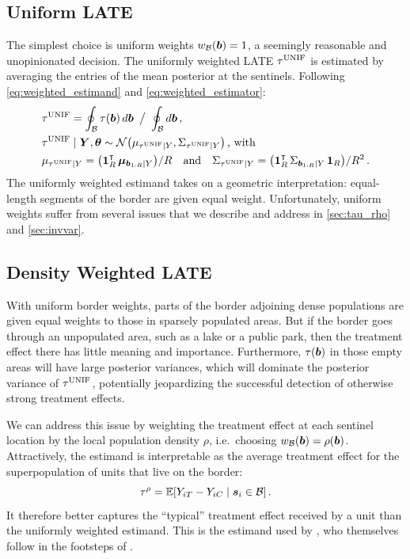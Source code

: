 \subsection{Uniform LATE}
The simplest choice is uniform weights \(w_{\mathcal{B}}(\bm{b})=1\), a seemingly reasonable and unopinionated decision.
The uniformly weighted LATE \(\tau^{\mathrm{UNIF}}\) is estimated by averaging the entries of the mean posterior at the sentinels.
Following \autoref{eq:weighted_estimand} and \autoref{eq:weighted_estimator}:
\begin{equation}\begin{split}
    &\unifavg = \oint_\border \tau(\sentinel) \dif\sentinel
        \ \big/ \ 
        \oint_\border \dif{\sentinel}  \,, \\
    &\unifavg \mid \Yvec, \hyperparam \sim \normal\del{\mu_{\unifavg \mid Y}, \Sigma_{\unifavg \mid Y}}\,\text{, with} \\
    &\mu_{\unifavg \mid Y} = \del{\ones_{\numsent}\trans \muvec_{\sentinels \mid Y}} / \numsent \quad\text{and}\quad
    \Sigma_{\unifavg \mid Y} = \del{\ones_{\numsent}\trans \Sigma_{\sentinels \mid Y} \ones_{\numsent}} / \numsent^2 \,.
\end{split}
\label{eq:unifavg}
\end{equation}
The uniformly weighted estimand takes on a geometric interpretation: equal-length segments of the border are given equal weight.
Unfortunately, uniform weights suffer from several issues that we describe and address in \autoref{sec:tau_rho} and \autoref{sec:invvar}.

\subsection{Density Weighted LATE}
\label{sec:tau_rho}

With uniform border weights, parts of the border adjoining dense populations are given equal weights to those in sparsely populated areas.
But if the border goes through an unpopulated area, such as a lake or a public park, then the treatment effect there has little meaning and importance.
Furthermore, \(\tau(\bm{b})\) in those empty areas will have large posterior variances, which will dominate the posterior variance of \(\tau^{\mathrm{UNIF}}\), potentially jeopardizing the successful detection of otherwise strong treatment effects.

We can address this issue by weighting the treatment effect at each sentinel location by the local population density \(\rho\),
i.e.\ choosing \(w_{\mathcal{B}}(\bm{b}) = \rho(\bm{b})\).
Attractively, the estimand is interpretable as the average treatment effect for the superpopulation of units that live on the border:
\begin{equation}
    \taurho = \E\sbr{Y_{i\treat} - Y_{i\ctrol} \mid \svec_i \in \border}\,.
\end{equation}
It therefore better captures the ``typical'' treatment effect received by a unit than the uniformly weighted estimand.
This is the estimand used by \cite{keele_titiunik_2015}, who themselves follow in the footsteps of \cite{imbens2011regression}.

